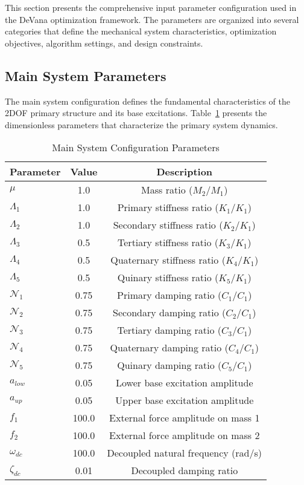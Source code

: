 \documentclass[12pt,a4paper]{article}
\newcommand{\softwareName}{DeVana}
\begin{document}
This section presents the comprehensive input parameter configuration used in the \softwareName{} optimization framework. The parameters are organized into several categories that define the mechanical system characteristics, optimization objectives, algorithm settings, and design constraints.

\subsection{Main System Parameters}

The main system configuration defines the fundamental characteristics of the 2DOF primary structure and its base excitations. Table~\ref{Tab:main_system_parameters} presents the dimensionless parameters that characterize the primary system dynamics.

\begin{table}[h!]
\centering
\caption{Main System Configuration Parameters}
\label{Tab:main_system_parameters}
\begin{tabular}{lcc}
\toprule
\textbf{Parameter} & \textbf{Value} & \textbf{Description} \\
\midrule
$\mu$ & 1.0 & Mass ratio ($M_2/M_1$) \\
$\Lambda_1$ & 1.0 & Primary stiffness ratio ($K_1/K_1$) \\
$\Lambda_2$ & 1.0 & Secondary stiffness ratio ($K_2/K_1$) \\
$\Lambda_3$ & 0.5 & Tertiary stiffness ratio ($K_3/K_1$) \\
$\Lambda_4$ & 0.5 & Quaternary stiffness ratio ($K_4/K_1$) \\
$\Lambda_5$ & 0.5 & Quinary stiffness ratio ($K_5/K_1$) \\
$\mathcal{N}_1$ & 0.75 & Primary damping ratio ($C_1/C_1$) \\
$\mathcal{N}_2$ & 0.75 & Secondary damping ratio ($C_2/C_1$) \\
$\mathcal{N}_3$ & 0.75 & Tertiary damping ratio ($C_3/C_1$) \\
$\mathcal{N}_4$ & 0.75 & Quaternary damping ratio ($C_4/C_1$) \\
$\mathcal{N}_5$ & 0.75 & Quinary damping ratio ($C_5/C_1$) \\
$a_{low}$ & 0.05 & Lower base excitation amplitude \\
$a_{up}$ & 0.05 & Upper base excitation amplitude \\
$f_1$ & 100.0 & External force amplitude on mass 1 \\
$f_2$ & 100.0 & External force amplitude on mass 2 \\
$\omega_{dc}$ & 100.0 & Decoupled natural frequency (rad/s) \\
$\zeta_{dc}$ & 0.01 & Decoupled damping ratio \\
\bottomrule
\end{tabular}
\end{table}
\end{document}
